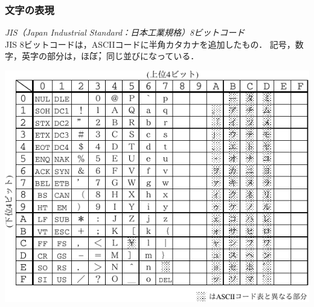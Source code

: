 \documentclass{beamer}                 %
\begin{document}
\begin{frame}
  \frametitle{文字の表現}
  \emph{JIS（Japan Industrial Standard：日本工業規格）8ビットコード}\\
  JIS 8ビットコードは，ASCIIコードに半角カタカナを追加したもの．
  記号，数字，英字の部分は，\.ほ\.ぼ，同じ並びになっている．

  \centerline{\includegraphics[scale=0.85]{../chap2/jisx0201.pdf}}

\end{frame}
\end{document}
